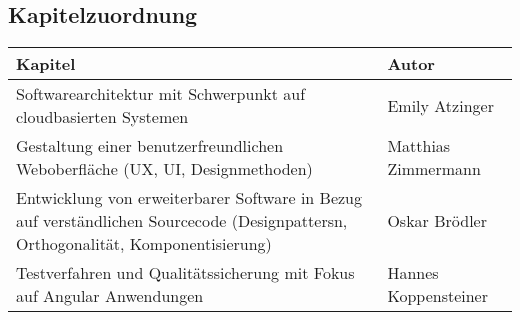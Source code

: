 \subsection*{Kapitelzuordnung}

    \begin{table}[H]
        \centering
        \begin{tabular}{p{10.5cm}|l}
             \textbf{Kapitel} & \textbf{Autor}\\ \hline
             Softwarearchitektur mit Schwerpunkt auf cloudbasierten Systemen & Emily Atzinger\\
             Gestaltung einer benutzerfreundlichen Weboberfläche (UX, UI, Designmethoden) & Matthias Zimmermann\\
             Entwicklung von erweiterbarer Software in Bezug auf verständlichen Sourcecode (Designpattersn, Orthogonalität, Komponentisierung) & Oskar Brödler\\
             Testverfahren und Qualitätssicherung mit Fokus auf Angular Anwendungen & Hannes Koppensteiner\\
        \end{tabular}
    \end{table}